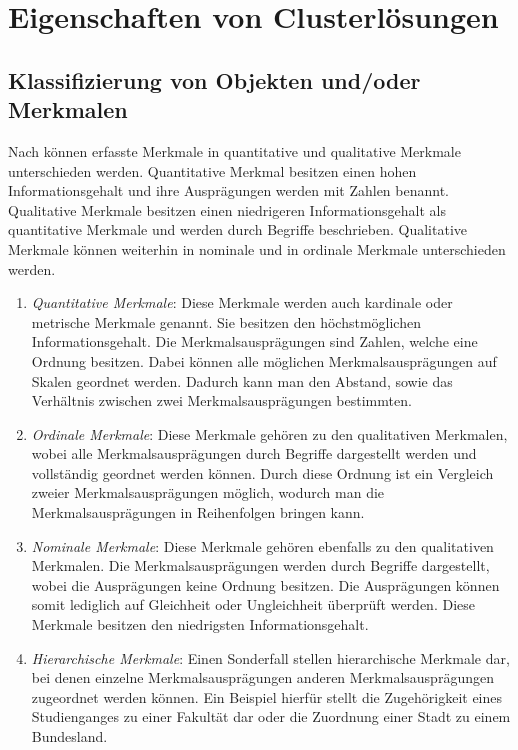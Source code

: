 \chapter{Eigenschaften von Clusterlösungen}

\section{Klassifizierung von Objekten und/oder Merkmalen}
Nach \citet[S. 158-163]{Bankhofer.2008} können erfasste Merkmale in quantitative und qualitative Merkmale unterschieden werden.
Quantitative Merkmal besitzen einen hohen Informationsgehalt und ihre Ausprägungen werden mit Zahlen benannt. Qualitative Merkmale besitzen einen niedrigeren Informationsgehalt als quantitative Merkmale und werden durch Begriffe beschrieben. Qualitative Merkmale können weiterhin in nominale und in ordinale Merkmale unterschieden werden.

\begin{enumerate}
        \item \textit{Quantitative Merkmale}: Diese Merkmale werden auch kardinale oder metrische Merkmale genannt. Sie besitzen den höchstmöglichen Informationsgehalt. Die Merkmalsausprägungen sind Zahlen, welche eine Ordnung besitzen. Dabei können alle möglichen Merkmalsausprägungen auf Skalen geordnet werden. Dadurch kann man den Abstand, sowie das Verhältnis zwischen zwei Merkmalsausprägungen bestimmten.
        \item \textit{Ordinale Merkmale}: Diese Merkmale gehören zu den qualitativen Merkmalen, wobei alle Merkmalsausprägungen durch Begriffe dargestellt werden und vollständig geordnet werden können. Durch diese Ordnung ist ein Vergleich zweier Merkmalsausprägungen möglich, wodurch man die Merkmalsausprägungen in Reihenfolgen bringen kann.
        \item \textit{Nominale Merkmale}: Diese Merkmale gehören ebenfalls zu den qualitativen Merkmalen. Die Merkmalsausprägungen werden durch Begriffe dargestellt, wobei die Ausprägungen keine Ordnung besitzen. Die Ausprägungen können somit lediglich auf Gleichheit oder Ungleichheit überprüft werden. Diese Merkmale besitzen den niedrigsten Informationsgehalt.
        \item \textit{Hierarchische Merkmale}: Einen Sonderfall stellen hierarchische Merkmale dar, bei denen einzelne Merkmalsausprägungen anderen Merkmalsausprägungen zugeordnet werden können. Ein Beispiel hierfür stellt die Zugehörigkeit eines Studienganges zu einer Fakultät dar oder die Zuordnung einer Stadt zu einem Bundesland.
\end{enumerate}

